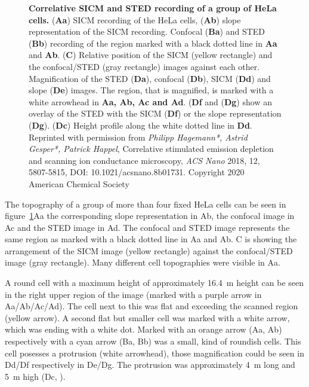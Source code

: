 
\begin{figure}	
  \centering
      \caption{
      \textbf{Correlative SICM and STED recording of a group of HeLa cells.} 
      (\textbf{Aa}) SICM recording of the HeLa cells, (\textbf{Ab}) slope representation of the
      SICM recording. Confocal (\textbf{Ba}) and STED (\textbf{Bb}) recording of the region marked 
      with a black dotted line in \textbf{Aa} and \textbf{Ab}. (\textbf{C}) Relative position of 
      the SICM (yellow rectangle) and the confocal/STED (gray rectangle) images against each 
      other. Magnification of the STED (\textbf{Da}), confocal (\textbf{Db}), SICM (\textbf{Dd}) 
      and slope (\textbf{De}) images. The region, that is magnified, is marked with a white 
      arrowhead in \textbf{Aa, Ab, Ac and Ad}. (\textbf{Df} and (\textbf{Dg}) show an overlay of 
      the STED with the SICM (\textbf{Df}) or the slope representation (\textbf{Dg}). 
      (\textbf{Dc}) Height profile along the white dotted line in \textbf{Dd}. \newline Reprinted 
      with permission from \emph{Philipp Hagemann*, Astrid Gesper*, Patrick Happel}, Correlative 
      stimulated emission depletion and scanning ion conductance microscopy, \emph{ACS Nano} 2018, 
      12, 5807-5815, DOI: 10.1021/acsnano.8b01731. Copyright 2020 American Chemical Society}
  \label{fig:SICM_STED1}
\end{figure}

The topography of a group of more than four fixed HeLa cells can be seen in 
figure~\ref{fig:SICM_STED1}Aa the corresponding slope representation in Ab, the confocal image in 
Ac and the STED image in Ad. The confocal and STED image represents the same region as marked with 
a black dotted line in Aa and Ab. C is showing the arrangement of the SICM image (yellow 
rectangle) against the confocal/STED image (gray rectangle). Many different cell topographies were
visible in Aa. 

A round cell with a maximum height of approximately 16.4~{\textmu}m height can be seen in the 
right upper region of the image (marked with a purple arrow in Aa/Ab/Ac/Ad). The cell next to this 
was flat and exceeding the scanned region (yellow arrow). A second flat but smaller cell was 
marked with a white arrow, which was ending with a white dot. Marked with an orange arrow (Aa, Ab) 
respectively with a cyan arrow (Ba, Bb) was a small, kind of roundish cells. This cell posesses 
a protrusion (white arrowhead), those magnification could be seen in Dd/Df respectively in De/Dg. 
The protrusion was approximately 4~{\textmu}m long and 5~{\textmu}m high (Dc, 
\cite{Hagemann2018}).

